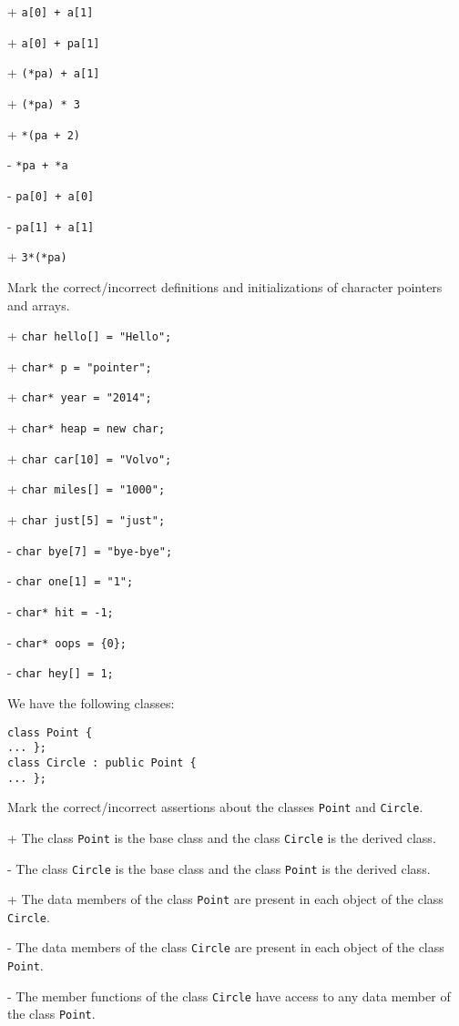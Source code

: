 + \verb|a[0] + a[1]|

+ \verb|a[0] + pa[1]|

+ \verb|(*pa) + a[1]|

+ \verb|(*pa) * 3|

+ \verb|*(pa + 2)|

- \verb|*pa + *a|

- \verb|pa[0] + a[0]|

- \verb|pa[1] + a[1]|

+ \verb|3*(*pa)|


\medskip
{}
Mark the correct/incorrect definitions and initializations 
of character pointers and arrays.

+ \verb|char hello[] = "Hello";|

+ \verb|char* p = "pointer";|

+ \verb|char* year = "2014";|

+ \verb|char* heap = new char;|

+ \verb|char car[10] = "Volvo";|

+ \verb|char miles[] = "1000";|

+ \verb|char just[5] = "just";|

- \verb|char bye[7] = "bye-bye";|

- \verb|char one[1] = "1";|

- \verb|char* hit = -1;|

- \verb|char* oops = {0};|

- \verb|char hey[] = 1;|


\medskip
{}
We have the following classes:
 \vspace{-3mm}\begin{verbatim}
class Point {
... };
class Circle : public Point {
... };
 \end{verbatim}\vspace{-6mm}
Mark the correct/incorrect assertions about the classes
\verb|Point| and \verb|Circle|.

+ The class \verb|Point| is the base class and the class \verb|Circle| is the derived class.

- The class \verb|Circle| is the base class and the class \verb|Point| is the derived class.

+ The data members of the class \verb|Point| are present in each object of the class \verb|Circle|.

- The data members of the class \verb|Circle| are present in each object of the class \verb|Point|.

- The member functions of the class \verb|Circle| have access to any data member of the class \verb|Point|.

